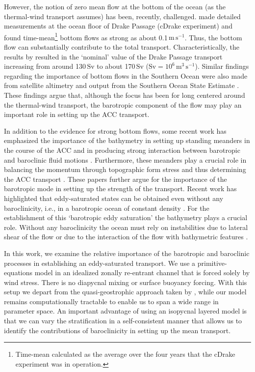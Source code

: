 \documentclass{agujournal2019}
\begin{document}
However, the notion of zero mean flow at the bottom of the ocean (as the thermal-wind transport assumes) has been, recently, challenged.  made detailed measurements at the ocean floor of Drake Passage (cDrake experiment) and found time-mean\footnote{Time-mean calculated as the average over the four years that the cDrake experiment was in operation.} bottom flows as strong as about 0.1$\,\text{m}\,\text{s}^{-1}$. Thus, the bottom flow can substantially contribute to the total transport. Characteristically, the results by  resulted in the `nominal' value of the Drake Passage transport increasing from around 130$\,\text{Sv}$ to about 170$\,\text{Sv}$ ($\text{Sv}=10^6\,\text{m}^3\,\text{s}^{-1}$).  Similar findings regarding the importance of bottom flows in the Southern Ocean were also made from satellite altimetry and output from the Southern Ocean State Estimate \cite{Rintoul-etal-2014, PenaMolino-etal-2014, Masich-etal-2015}. These findings argue that, although the focus has been for long centered around the thermal-wind transport, the barotropic component of the flow may play an important role in setting up the ACC transport. 

In addition to the evidence for strong bottom flows, some recent work has emphasized the importance of the bathymetry in setting up standing meanders in the course of the ACC {\color{black}and in producing strong interaction between barotropic and baroclinic fluid motions} \cite{Youngs-etal-2017, Barthel-etal-2017}. Furthermore, these meanders play a crucial role in balancing the momentum through topographic form stress and thus determining the ACC transport \cite{Thompson-NaveiraGarabato-2014,Katsumata-2017}. These papers further argue for the importance of the barotropic mode in setting up the strength of the transport. Recent work has highlighted that eddy-saturated states can be obtained even without any baroclinicity, i.e., in a barotropic ocean of constant density \cite{Constantinou-Young-2017, Constantinou-2018}. For the establishment of this `barotropic eddy saturation' the bathymetry plays a crucial role. Without any baroclinicity the ocean must rely on instabilities due to lateral shear of the flow or due to the interaction of the flow with bathymetric features \cite{Hart-1979, Charney-Flierl-1980}. 

In this work, we examine the relative importance of the barotropic and baroclinic processes in establishing an eddy-saturated transport. We use a primitive-equations model in an idealized zonally re-entrant channel that is forced solely by wind stress. {\color{black}There is no diapycnal mixing or surface buoyancy forcing.} With this setup we depart from the quasi-geostrophic approach taken by , while our model remains computationally tractable  to enable us to span a wide range in parameter space. An important advantage of using an isopycnal layered model is that we can vary the stratification in a self-consistent manner that allows us to identify the contributions of baroclinicity in setting up the mean transport.
\end{document}
